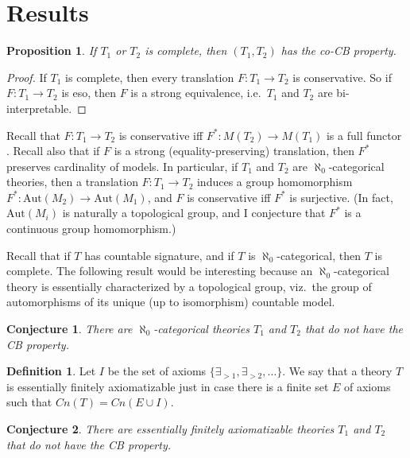 \documentclass[12pt]{article}
\newtheorem*{conj}{Conjecture}
\newtheorem*{prop}{Proposition}
\theoremstyle{definition}
\newtheorem*{defn}{Definition}
\begin{document}
\section{Results}

\begin{prop} If $T_1$ or $T_2$ is complete, then $(T_1,T_2)$ has the
  co-CB property. \end{prop}

\begin{proof} If $T_1$ is complete, then every translation
  $F:T_1\to T_2$ is conservative. So if $F:T_1\to T_2$ is eso, then
  $F$ is a strong equivalence, i.e.\ $T_1$ and $T_2$ are
  bi-interpretable. \end{proof}

Recall that $F:T_1\to T_2$ is conservative iff $F^*:M(T_2)\to M(T_1)$
is a full functor \citep{barrett2020}. Recall also that if $F$ is a
strong (equality-preserving) translation, then $F^*$ preserves
cardinality of models. In particular, if $T_1$ and $T_2$ are
$\aleph _0$-categorical theories, then a translation $F:T_1\to T_2$
induces a group homomorphism
$F^*:\mathrm{Aut}(M_2)\to \mathrm{Aut}(M_1)$, and $F$ is conservative
iff $F^*$ is surjective. (In fact, $\mathrm{Aut}(M_i)$ is naturally a
topological group, and I conjecture that $F^*$ is a continuous group
homomorphism.)

Recall that if $T$ has countable signature, and if $T$ is
$\aleph _0$-categorical, then $T$ is complete. The following result
would be interesting because an $\aleph _0$-categorical theory is
essentially characterized by a topological group, viz.\ the group of
automorphisms of its unique (up to isomorphism) countable model.


\begin{conj} There are $\aleph _0$-categorical theories $T_1$ and
  $T_2$ that do not have the CB property. \end{conj}

\begin{defn} Let $I$ be the set of axioms
  $\{ \exists _{>1},\exists _{>2},\dots \}$. We say that a theory $T$
  is essentially finitely axiomatizable just in case there is a finite
  set $E$ of axioms such that $Cn(T)=Cn(E\cup I)$. \end{defn}

\begin{conj} There are essentially finitely axiomatizable theories
  $T_1$ and $T_2$ that do not have the CB property. \end{conj}
\end{document}
